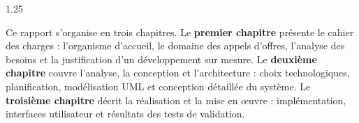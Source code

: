 \begin{spacing}{1.25}
\vspace{0.4cm}

Ce rapport s'organise en trois chapitres. Le \textbf{premier chapitre} présente le cahier des charges : l'organisme d'accueil, le domaine des appels d'offres, l'analyse des besoins et la justification d'un développement sur mesure. Le \textbf{deuxième chapitre} couvre l'analyse, la conception et l'architecture : choix technologiques, planification, modélisation UML et conception détaillée du système. Le \textbf{troisième chapitre} décrit la réalisation et la mise en œuvre : implémentation, interfaces utilisateur et résultats des tests de validation.

\end{spacing}

\newpage
